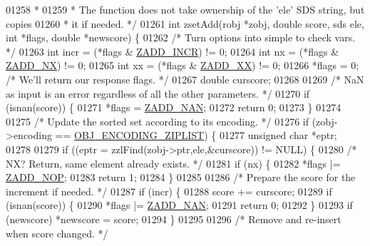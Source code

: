 \begin{DoxyCode}
01258 \textcolor{comment}{ *}
01259 \textcolor{comment}{ * The function does not take ownership of the 'ele' SDS string, but copies}
01260 \textcolor{comment}{ * it if needed. */}
01261 \textcolor{keywordtype}{int} zsetAdd(robj *zobj, \textcolor{keywordtype}{double} score, sds ele, \textcolor{keywordtype}{int} *flags, \textcolor{keywordtype}{double} *newscore) \{
01262     \textcolor{comment}{/* Turn options into simple to check vars. */}
01263     \textcolor{keywordtype}{int} incr = (*flags & \hyperlink{server_8h_aa31f5564c57b55123a4e2d6a5eb599cf}{ZADD\_INCR}) != 0;
01264     \textcolor{keywordtype}{int} nx = (*flags & \hyperlink{server_8h_a708539c0c5926d4c12c4bb2bb45513b2}{ZADD\_NX}) != 0;
01265     \textcolor{keywordtype}{int} xx = (*flags & \hyperlink{server_8h_a4bc45df3143a1110ca9b8a67d25f47eb}{ZADD\_XX}) != 0;
01266     *flags = 0; \textcolor{comment}{/* We'll return our response flags. */}
01267     \textcolor{keywordtype}{double} curscore;
01268 
01269     \textcolor{comment}{/* NaN as input is an error regardless of all the other parameters. */}
01270     \textcolor{keywordflow}{if} (isnan(score)) \{
01271         *flags = \hyperlink{server_8h_ae46720414ddb69ab95bbade04b15194c}{ZADD\_NAN};
01272         \textcolor{keywordflow}{return} 0;
01273     \}
01274 
01275     \textcolor{comment}{/* Update the sorted set according to its encoding. */}
01276     \textcolor{keywordflow}{if} (zobj->encoding == \hyperlink{server_8h_aabf064ede983103f1fd0df2086e84eee}{OBJ\_ENCODING\_ZIPLIST}) \{
01277         \textcolor{keywordtype}{unsigned} \textcolor{keywordtype}{char} *eptr;
01278 
01279         \textcolor{keywordflow}{if} ((eptr = zzlFind(zobj->ptr,ele,&curscore)) != NULL) \{
01280             \textcolor{comment}{/* NX? Return, same element already exists. */}
01281             \textcolor{keywordflow}{if} (nx) \{
01282                 *flags |= \hyperlink{server_8h_afd0096ac4bedddb9b0b7f27396839c06}{ZADD\_NOP};
01283                 \textcolor{keywordflow}{return} 1;
01284             \}
01285 
01286             \textcolor{comment}{/* Prepare the score for the increment if needed. */}
01287             \textcolor{keywordflow}{if} (incr) \{
01288                 score += curscore;
01289                 \textcolor{keywordflow}{if} (isnan(score)) \{
01290                     *flags |= \hyperlink{server_8h_ae46720414ddb69ab95bbade04b15194c}{ZADD\_NAN};
01291                     \textcolor{keywordflow}{return} 0;
01292                 \}
01293                 \textcolor{keywordflow}{if} (newscore) *newscore = score;
01294             \}
01295 
01296             \textcolor{comment}{/* Remove and re-insert when score changed. */}

\end{DoxyCode}
